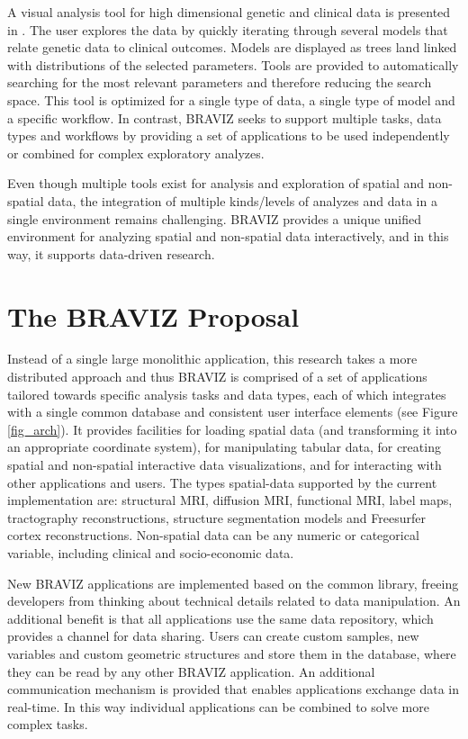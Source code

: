 \documentclass[twocolumn]{svjour3}
\begin{document}
A visual analysis tool for high dimensional genetic and clinical data is presented in \cite{hinterberg_peax:_2014}. The user explores the data by quickly iterating through several models that relate genetic data to clinical outcomes. Models are displayed as trees land linked with distributions of the selected parameters. Tools are provided to automatically searching for the most relevant parameters and therefore reducing the search space. This tool is optimized for a single type of data, a single type of model and a specific workflow. In contrast, BRAVIZ seeks to support multiple tasks, data types and workflows by providing a set of  applications to be used independently or combined for complex exploratory analyzes.
	
Even though multiple tools  exist for analysis and exploration of spatial and non-spatial data, the integration of multiple kinds/levels of analyzes and data in a single environment remains challenging. BRAVIZ provides a unique unified environment for analyzing spatial and non-spatial data interactively, and in this way, it supports data-driven research.

\section{The BRAVIZ Proposal}

Instead of a single large monolithic application, this research takes a more distributed approach and thus BRAVIZ is comprised of a set of applications tailored towards specific analysis tasks and data types, each of which integrates with a single common database and consistent user interface elements (see Figure \ref{fig_arch}). It provides facilities for loading spatial data (and transforming it into an appropriate coordinate system), for manipulating tabular data, for creating spatial and non-spatial interactive data visualizations, and for interacting with other applications and users. The types spatial-data supported by the current implementation are: structural MRI, diffusion MRI, functional MRI, label maps, tractography reconstructions, structure segmentation models and Freesurfer cortex reconstructions. Non-spatial data can be any numeric or categorical variable, including clinical and socio-economic data.

New BRAVIZ applications are implemented based on the common library, freeing developers from thinking about technical details related to data manipulation. An additional benefit is that all applications use the same data repository, which provides a channel for data sharing. Users can create custom samples, new variables and custom geometric structures and store them in the database, where they can be read by any other BRAVIZ application. An additional communication mechanism is provided that enables applications exchange data in real-time. In this way individual applications can be combined to solve more complex tasks.
\end{document}
